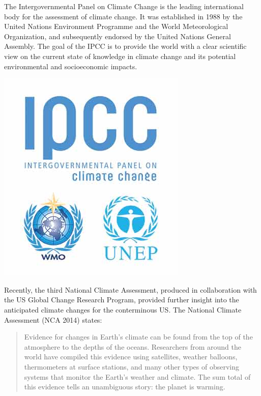 \documentclass[
  letterpaper,
]{scrreprt}\usepackage{amsmath,amssymb}
\begin{document}
\begin{tcolorbox}[standard jigsaw,colbacktitle=quarto-callout-note-color!10!white, bottomtitle=1mm, toptitle=1mm, rightrule=.15mm, leftrule=.75mm, titlerule=0mm, title={What is the IPCC}, arc=.35mm, bottomrule=.15mm, colframe=quarto-callout-note-color-frame, opacityback=0, opacitybacktitle=0.6, colback=white, left=2mm, toprule=.15mm, coltitle=black]
The Intergovernmental Panel on Climate Change is the leading
international body for the assessment of climate change. It was
established in 1988 by the United Nations Environment Programme and the
World Meteorological Organization, and subsequently endorsed by the
United Nations General Assembly. The goal of the IPCC is to provide the
world with a clear scientific view on the current state of knowledge in
climate change and its potential environmental and socioeconomic
impacts.

\includegraphics{./assets/ipcc.jpg}
\end{tcolorbox}

Recently, the third National Climate Assessment, produced in
collaboration with the US Global Change Research Program, provided
further insight into the anticipated climate changes for the
conterminous US. The National Climate Assessment (NCA 2014) states:

\begin{quote}
Evidence for changes in Earth's climate can be found from the top of the
atmosphere to the depths of the oceans. Researchers from around the
world have compiled this evidence using satellites, weather balloons,
thermometers at surface stations, and many other types of observing
systems that monitor the Earth's weather and climate. The sum total of
this evidence tells an unambiguous story: the planet is warming.
\end{quote}
\end{document}
